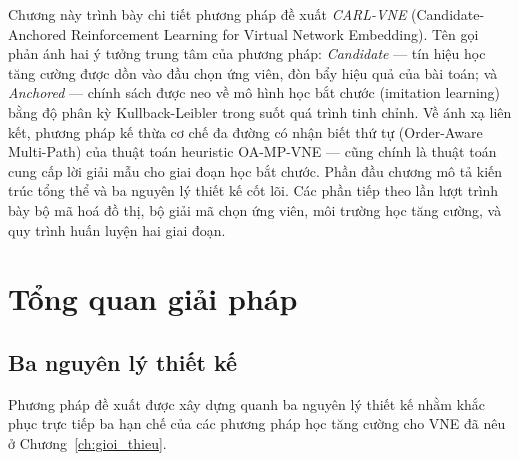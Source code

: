 \documentclass[../DoAn.tex]{subfiles}
\begin{document}
\label{ch:de_xuat}

Chương này trình bày chi tiết phương pháp đề xuất \textit{CARL-VNE} (Candidate-Anchored Reinforcement Learning for Virtual Network Embedding). Tên gọi phản ánh hai ý tưởng trung tâm của phương pháp: \textit{Candidate} — tín hiệu học tăng cường được dồn vào đầu chọn ứng viên, đòn bẩy hiệu quả của bài toán; và \textit{Anchored} — chính sách được neo về mô hình học bắt chước (imitation learning) bằng độ phân kỳ Kullback-Leibler trong suốt quá trình tinh chỉnh. Về ánh xạ liên kết, phương pháp kế thừa cơ chế đa đường có nhận biết thứ tự (Order-Aware Multi-Path) của thuật toán heuristic OA-MP-VNE — cũng chính là thuật toán cung cấp lời giải mẫu cho giai đoạn học bắt chước. Phần đầu chương mô tả kiến trúc tổng thể và ba nguyên lý thiết kế cốt lõi. Các phần tiếp theo lần lượt trình bày bộ mã hoá đồ thị, bộ giải mã chọn ứng viên, môi trường học tăng cường, và quy trình huấn luyện hai giai đoạn.

\section{Tổng quan giải pháp}                  %
\label{sec:overview}

\subsection{Ba nguyên lý thiết kế}
\label{subsec:design-principles}

Phương pháp đề xuất được xây dựng quanh ba nguyên lý thiết kế nhằm khắc phục trực tiếp ba hạn chế của các phương pháp học tăng cường cho VNE đã nêu ở Chương~\ref{ch:gioi_thieu}.
\end{document}
